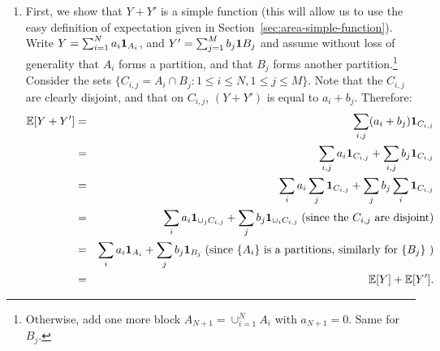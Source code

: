 \documentclass{article}
\begin{document}
\begin{enumerate}
  \item First, we show that $Y + Y'$ is a simple function (this will allow us to use the easy definition of expectation given in Section~\ref{sec:area-simple-function}). Write $Y = \sum_{i=1}^N a_i {\mathbf 1}_{A_i}$, and $Y' = \sum_{j=1}^M b_j {\mathbf 1}{B_j}$ and assume without loss of generality that $A_i$ forms a partition, and that $B_j$ forms another partition.\footnote{Otherwise, add one more block $A_{N+1} = \cup_{i=1}^N A_i$ with $a_{N+1} = 0$. Same for $B_j$.} Consider the sets $\{C_{i,j} = A_i \cap B_j : 1\le i \le N, 1\le j \le M\}$. Note that the $C_{i,j}$ are clearly disjoint, and that on $C_{i,j}$, $(Y + Y')$ is equal to $a_i + b_j$. Therefore:
\begin{eqnarray*}
{\mathbb E}[Y + Y'] &=& \sum_{i,j} (a_i + b_j) {\mathbf 1}_{C_{i,j}} \\
&=& \sum_{i,j} a_i {\mathbf 1}_{C_{i,j}} + \sum_{i,j} b_j {\mathbf 1}_{C_{i,j}} \\
&=& \sum_{i} a_i \sum_j {\mathbf 1}_{C_{i,j}} + \sum_{j} b_j \sum_i {\mathbf 1}_{C_{i,j}} \\
&=& \sum_{i} a_i  {\mathbf 1}_{\cup_j C_{i,j}} + \sum_{j} b_j  {\mathbf 1}_{\cup_i C_{i,j}} \;\text{(since the }C_{i,j}\text{ are disjoint)} \\
&=& \sum_{i} a_i  {\mathbf 1}_{A_i} + \sum_{j} b_j  {\mathbf 1}_{B_j} \;\text{(since }\{A_{i}\}\text{ is a partitions, similarly for }\{B_{j}\} \text{ )} \\
&=& {\mathbb E}[Y] + {\mathbb E}[Y'].
\end{eqnarray*}

\end{enumerate}
\end{document}
